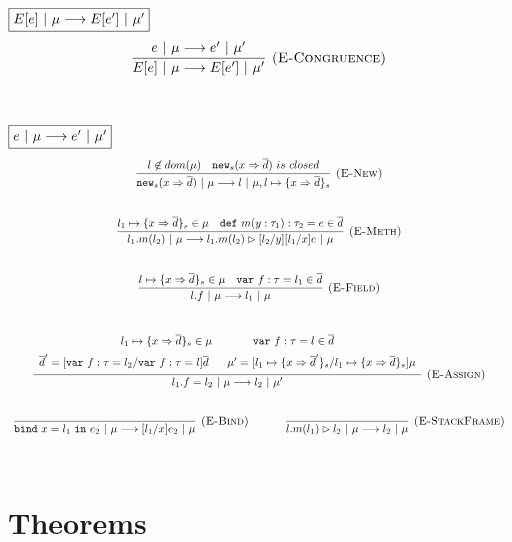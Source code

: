 \documentclass{llncs}
\newcommand{\keywadj}[1]{\mathtt{#1}}
\newcommand{\keyw}[1]{\keywadj{#1}~}
\begin{document}
$\fbox{$E[e]~|~\mu \longrightarrow E[e']~|~\mu'$}$
\[
\begin{array}{c}
\infer[\textsc{(E-Congruence)}]
  {E[e]~|~\mu \longrightarrow E[e']~|~\mu'}
  {e~|~\mu \longrightarrow e'~|~\mu'}\\[5ex]  
\end{array}
\]


$\fbox{$e~|~\mu \longrightarrow e'~|~\mu'$}$
\[
\begin{array}{c}
\infer[\textsc{(E-New)}]
  {\keywadj{new}_{s}(x \Rightarrow \overline{d})~|~\mu \longrightarrow l~|~\mu, l \mapsto \{ x \Rightarrow \overline{d} \}_{s}}
  {l \not\in dom(\mu) & \keywadj{new}_{s}(x \Rightarrow \overline{d})~is~closed}\\[5ex]

\infer[\textsc{(E-Meth)}]
  {l_1.m(l_2)~|~\mu \longrightarrow l_1.m(l_2) \rhd [l_2/y][l_1/x]e~|~\mu}
  {l_1 \mapsto \{ x \Rightarrow \overline{d} \}_{s} \in \mu & \keyw{def} m(y : \tau_1) : \tau_2 = e \in \overline{d}}\\[5ex]
\infer[\textsc{(E-Field)}]
  {l.f~|~\mu \longrightarrow l_1~|~\mu}
  {l \mapsto \{ x \Rightarrow \overline{d} \}_{s} \in \mu & \keyw{var} f:\tau = l_1 \in \overline{d}}\\[5ex]

\infer[\textsc{(E-Assign)}]
  {l_1.f = l_2~|~\mu \longrightarrow l_2~|~\mu'}
  {\def\arraystretch{1.6}
  \begin{array}{c}
l_1 \mapsto \{ x \Rightarrow \overline{d} \}_{s} \in \mu~~~~~~~~~~~\keyw{var} f:\tau = l \in \overline{d} \\
\overline{d}' = [\keyw{var} f:\tau = l_2/\keyw{var} f:\tau = l]\overline{d}~~~~~\mu' = [l_1 \mapsto \{ x \Rightarrow \overline{d}' \}_{s}/l_1 \mapsto \{ x \Rightarrow \overline{d} \}_{s}]\mu
  \end{array}}\\[5ex]

\infer[\textsc{(E-Bind)}]
  {\keyw{bind} x = l_1~\keyw{in} e_2~|~\mu \longrightarrow [l_1/x]e_2~|~\mu}
  {}%
~~~~~~~~~~
\infer[\textsc{(E-StackFrame)}]
  {l.m(l_1) \rhd l_2~|~\mu \longrightarrow l_2~|~\mu}
  {}\\[5ex]
  
\end{array}
\]

\newpage

\section{Theorems}
\end{document}
